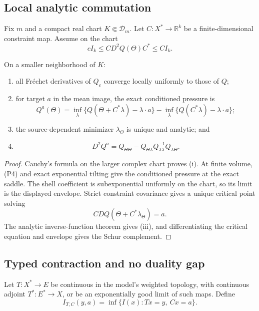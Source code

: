 \subsection{Local analytic commutation}

Fix \(m\) and a compact real chart
\(K\Subset\mathcal D_m\).  Let
\(C:X^*\to\mathbb R^k\) be a finite-dimensional constraint map.  Assume on the
chart
\[
 cI_k\le C D^2Q(\Theta)C^*\le CI_k.
\]

\begin{theorem}
\label{thm:r5-d1-local}
On a smaller neighborhood of \(K\):
\begin{enumerate}[label=(\roman*)]
\item all Fr\'echet derivatives of \(Q_\varepsilon\) converge locally
      uniformly to those of \(Q\);
\item for target \(a\) in the mean image, the exact conditioned pressure is
\[
 Q^a(\Theta)=
 \inf_\lambda\{Q(\Theta+C^*\lambda)-\lambda\cdot a\}
 -\inf_\lambda\{Q(C^*\lambda)-\lambda\cdot a\};
\]
\item the source-dependent minimizer \(\lambda_\Theta\) is unique and
      analytic; and
\item
\[
 D^2Q^a=Q_{\Theta\Theta}
 -Q_{\Theta\lambda}Q_{\lambda\lambda}^{-1}
 Q_{\lambda\Theta}.
\]
\end{enumerate}
\end{theorem}

\begin{proof}
Cauchy's formula on the larger complex chart proves (i).  At finite volume,
(P4) and exact exponential tilting give the conditioned pressure at the exact
saddle.  The shell coefficient is subexponential uniformly on the chart, so
its limit is the displayed envelope.  Strict constraint covariance gives a
unique critical point solving
\[
 CDQ(\Theta+C^*\lambda_\Theta)=a.
\]
The analytic inverse-function theorem gives (iii), and differentiating the
critical equation and envelope gives the Schur complement.
\end{proof}

\subsection{Typed contraction and no duality gap}

Let \(T:X^*\to E\) be continuous in the model's weighted topology, with
continuous adjoint \(T^*:E^*\to X\), or be an exponentially good limit of such
maps.  Define
\[
 I_{T,C}(y,a)=\inf\{I(x):Tx=y,\ Cx=a\}.
\]

